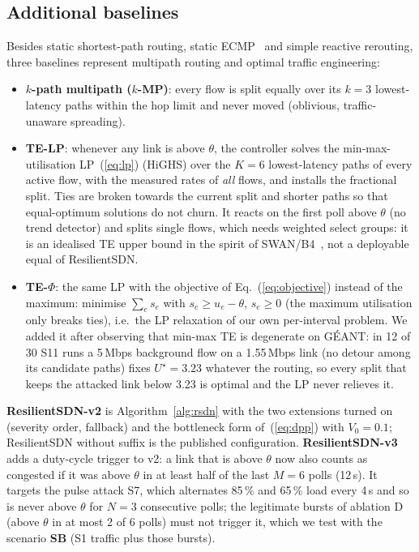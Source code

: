 \subsection{Additional baselines}\label{sec:baselines}
Besides static shortest-path routing, static ECMP~\cite{rfc2992} and simple reactive rerouting, three
baselines represent multipath routing and optimal traffic engineering:
\begin{itemize}
\item \textbf{$k$-path multipath ($k$-MP)}: every flow is split equally over its $k=3$
  lowest-latency paths within the hop limit and never moved (oblivious, traffic-unaware spreading).
\item \textbf{TE-LP}: whenever any link is above $\theta$, the controller solves the min-max-utilisation
  LP~(\ref{eq:lp}) (HiGHS) over the $K=6$ lowest-latency paths of every active flow, with the
  measured rates of \emph{all} flows, and installs the fractional split. Ties are broken towards
  the current split and shorter paths so that equal-optimum solutions do not churn. It reacts on
  the first poll above $\theta$ (no trend detector) and splits single flows, which needs weighted
  select groups: it is an idealised TE upper bound in the spirit of
  SWAN/B4~\cite{hong2013swan,jain2013b4}, not a deployable equal of ResilientSDN.
\item \textbf{TE-$\Phi$}: the same LP with the objective of Eq.~(\ref{eq:objective}) instead of the
  maximum: minimise $\sum_e s_e$ with $s_e\ge u_e-\theta$, $s_e\ge0$ (the maximum utilisation only
  breaks ties), i.e.\ the LP relaxation of our own per-interval problem. We added it after observing
  that min-max TE is degenerate on G\'EANT: in 12 of 30 S11 runs a 5\,Mbps background flow on a
  1.55\,Mbps link (no detour among its candidate paths) fixes $U^\star=3.23$ whatever the routing, so
  every split that keeps the attacked link below 3.23 is optimal and the LP never relieves it.
\end{itemize}
\textbf{ResilientSDN-v2} is Algorithm~\ref{alg:rsdn} with the two extensions turned on (severity
order, fallback) and the bottleneck form of~(\ref{eq:dpp}) with $V_0=0.1$; ResilientSDN without
suffix is the published configuration. \textbf{ResilientSDN-v3} adds a duty-cycle trigger to v2: a
link that is above $\theta$ now also counts as congested if it was above $\theta$ in at least half of the
last $M=6$ polls (12\,s). It targets the pulse attack S7, which alternates 85\,\% and 65\,\% load every
4\,s and so is never above $\theta$ for $N=3$ consecutive polls; the legitimate bursts of ablation D
(above $\theta$ in at most 2 of 6 polls) must not trigger it, which we test with the scenario
\textbf{SB} (S1 traffic plus those bursts).

